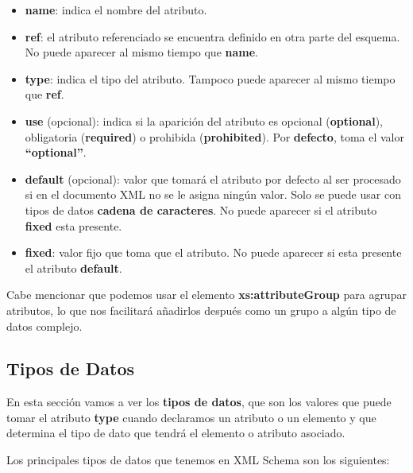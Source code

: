 \begin{itemize}
    \item \textbf{name}: indica el nombre del atributo.
    \item \textbf{ref}: el atributo referenciado se encuentra definido en otra parte del esquema. No puede aparecer al mismo tiempo que \textbf{name}.
    \item \textbf{type}: indica el tipo del atributo. Tampoco puede aparecer al mismo tiempo que \textbf{ref}.
    \item \textbf{use} (opcional): indica si la aparición del atributo es opcional (\textbf{optional}), obligatoria (\textbf{required}) o prohibida (\textbf{prohibited}). Por \textbf{defecto}, toma el valor \textbf{``optional''}.
    \item \textbf{default} (opcional): valor que tomará el atributo por defecto al ser procesado si en el documento XML no se le asigna ningún valor. Solo se puede usar con tipos de datos \textbf{cadena de caracteres}. No puede aparecer si el atributo \textbf{fixed} esta presente.
    \item \textbf{fixed}: valor fijo que toma que el atributo. No puede aparecer si esta presente el atributo \textbf{default}.
\end{itemize}

Cabe mencionar que podemos usar el elemento \textbf{xs:attributeGroup} para agrupar atributos, lo que nos facilitará añadirlos después como un grupo a algún tipo de datos complejo.

\subsection{Tipos de Datos}
En esta sección vamos a ver los \textbf{tipos de datos}, que son los valores que puede tomar el atributo \textbf{type} cuando declaramos un atributo o un elemento y que determina el tipo de dato que tendrá el elemento o atributo asociado.

Los principales tipos de datos que tenemos en XML Schema son los siguientes:

